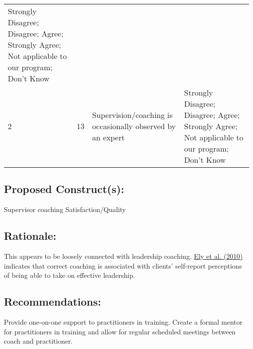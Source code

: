 \documentclass[]{article}
\begin{document}
\begin{longtable}[]{@{}llll@{}}
\begin{minipage}[t]{0.39\columnwidth}
Strongly Disagree; Disagree; Agree; Strongly Agree; Not applicable to
our program; Don't Know\strut
\end{minipage}\tabularnewline
\begin{minipage}[t]{0.05\columnwidth}\raggedright\strut
2\strut
\end{minipage} & \begin{minipage}[t]{0.04\columnwidth}\raggedright\strut
13\strut
\end{minipage} & \begin{minipage}[t]{0.41\columnwidth}\raggedright\strut
Supervision/coaching is occasionally observed by an expert\strut
\end{minipage} & \begin{minipage}[t]{0.39\columnwidth}\raggedright\strut
Strongly Disagree; Disagree; Agree; Strongly Agree; Not applicable to
our program; Don't Know\strut
\end{minipage}\tabularnewline
\bottomrule
\end{longtable}

\subsection{\texorpdfstring{\textbf{Proposed
Construct(s)}:}{Proposed Construct(s):}}\label{proposed-constructs-1}

Supervisor coaching Satisfaction/Quality

\subsection{\texorpdfstring{\textbf{Rationale}:}{Rationale:}}\label{rationale-1}

This appears to be loosely connected with leadership coaching.
\href{https://www.sciencedirect.com/science/article/pii/S1048984310000895}{Ely
et al. (2010)} indicates that correct coaching is associated with
clients' self-report perceptions of being able to take on effective
leadership.

\subsection{\texorpdfstring{\textbf{Recommendations}:}{Recommendations:}}\label{recommendations-1}

Provide one-on-one support to practitioners in training. Create a formal
mentor for practitioners in training and allow for regular scheduled
meetings between coach and practitioner.
\end{document}
